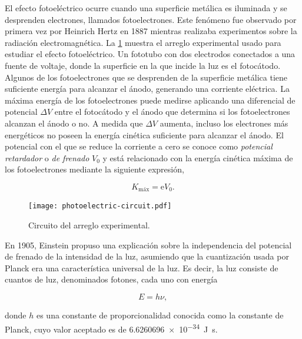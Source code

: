 \documentclass[12pt]{IEEEtran}
\begin{document}
El efecto fotoeléctrico ocurre cuando una superficie metálica es iluminada y se desprenden electrones, llamados fotoelectrones. Este fenómeno fue observado por primera vez por Heinrich Hertz en 1887 mientras realizaba experimentos sobre la radiación electromagnética.\cite{kraneModernPhysics2019a} 
La \cref{fig:photoelectric-circuit} muestra el arreglo experimental usado para estudiar el efecto fotoeléctrico. Un fototubo con dos electrodos conectados a una fuente de voltaje, donde la superficie en la que incide la luz es el fotocátodo. Algunos de los fotoelectrones que se desprenden de la superficie metálica tiene suficiente energía para alcanzar el ánodo, generando una corriente eléctrica. \cite{tiplerModernPhysics2012} La máxima energía de los fotoelectrones puede medirse aplicando una diferencial de potencial \(\Delta V\) entre el fotocátodo y el ánodo que determina si los fotoelectrones alcanzan el ánodo o no. A medida que \(\Delta V\) aumenta, incluso los electrones más energéticos no poseen la energía cinética suficiente para alcanzar el ánodo. El potencial con el que se reduce la corriente a cero se conoce como \emph{potencial retardador} o \emph{de frenado} \(V_{0}\) y está relacionado con la energía cinética máxima de los fotoelectrones mediante la siguiente expresión\cite{kraneModernPhysics2019a, beiserConceptsModernPhysics2003},

\begin{equation}
    K_{\text{máx}} = \mathrm{e}V_{0}.
    \label{eq:k-max}
\end{equation}

\begin{figure}[htp]
    \centering
    \texttt{[image: photoelectric-circuit.pdf]}
    \caption{Circuito del arreglo experimental.\cite{EfectoFotoelectrico}}
    \label{fig:photoelectric-circuit}
\end{figure}

En 1905, Einstein propuso una explicación sobre la independencia del potencial de frenado de la intensidad de la luz, asumiendo que la cuantización usada por Planck era una característica universal de la luz. Es decir, la luz consiste de cuantos de luz, denominados fotones, cada uno con energía

\begin{equation}
    E = h\nu,
    \label{eq:photon-energy}
\end{equation}

donde \(h\) es una constante de proporcionalidad conocida como la constante de Planck, cuyo valor aceptado es de \qty{6.6260696e-34}{\J\s}.
\end{document}
